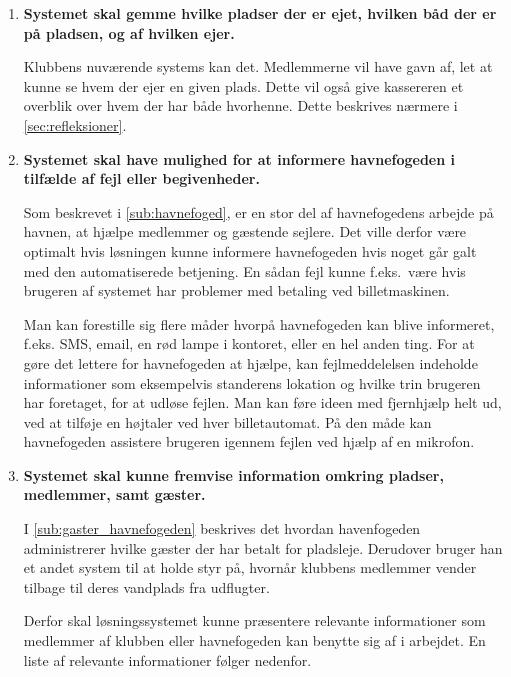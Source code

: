 \begin{enumerate}
\item \label{itm:gemme_pladser_baade} \textbf{Systemet skal gemme hvilke pladser der er ejet, hvilken båd der er på pladsen, og af hvilken ejer.}

  Klubbens nuværende systems kan det. Medlemmerne vil have gavn af, let at kunne se hvem der ejer en given plads. Dette vil også give kassereren et overblik over hvem der har både hvorhenne. Dette beskrives nærmere i \cref{sec:refleksioner}.

\item \label{itm:fejl} \textbf{Systemet skal have mulighed for at informere havnefogeden i tilfælde af fejl eller begivenheder.}

  Som beskrevet i \cref{sub:havnefoged}, er en stor del af havnefogedens arbejde på havnen, at hjælpe medlemmer og gæstende sejlere. Det ville derfor være optimalt hvis løsningen kunne informere havnefogeden hvis noget går galt med den automatiserede betjening. En sådan fejl kunne f.eks.\ være hvis brugeren af systemet har problemer med betaling ved billetmaskinen.

  Man kan forestille sig flere måder hvorpå havnefogeden kan blive informeret, f.eks. SMS, email, en rød lampe i kontoret, eller en hel anden ting. For at gøre det lettere for havnefogeden at hjælpe, kan fejlmeddelelsen indeholde informationer som eksempelvis standerens lokation og hvilke trin brugeren har foretaget, for at udløse fejlen. Man kan føre ideen med fjernhjælp helt ud, ved at tilføje en højtaler ved hver billetautomat. På den måde kan havnefogeden assistere brugeren igennem fejlen ved hjælp af en mikrofon.

\item \label{itm:vis_information} \textbf{Systemet skal kunne fremvise information omkring pladser, medlemmer, samt gæster.}

  I \cref{sub:gaster_havnefogeden} beskrives det hvordan havenfogeden administrerer hvilke gæster der har betalt for pladsleje. Derudover bruger han et andet system til at holde styr på, hvornår klubbens medlemmer vender tilbage til deres vandplads fra udflugter.

  Derfor skal løsningssystemet kunne præsentere relevante informationer som medlemmer af klubben eller havnefogeden kan benytte sig af i arbejdet. En liste af relevante informationer følger nedenfor.


\end{enumerate}
